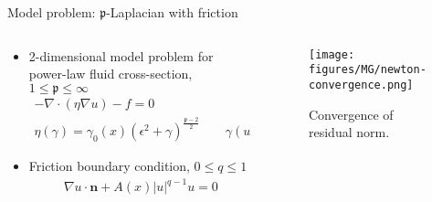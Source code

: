 \documentclass[final,t]{beamer}
\newcommand\pfrak{{\mathfrak p}}
\newcommand{\abs}[1]{\left\lvert #1 \right\rvert}
\begin{document}
\begin{frame}{}
\begin{columns}
\begin{column}{0.31\textwidth}
      \vspace{-2em}
      \begin{block}{Model problem: $\mathfrak p$-Laplacian with friction}        
        \begin{columns}
          \begin{column}{0.7\textwidth}
            \begin{itemize}
            \item 2-dimensional model problem for power-law fluid cross-section, $1 \le \pfrak \le \infty$
              \begin{gather*}
                -\nabla\cdot (\eta \nabla u) - f = 0 \\
                \eta(\gamma) = \gamma_0(x) (\epsilon^2 + \gamma)^{\frac{\pfrak-2}{2}} \qquad \gamma(u) = \frac 1 2 \abs{\nabla u}^2
              \end{gather*}
            \item Friction boundary condition, $0 \le q \le 1$
              \begin{gather*}
                \nabla u \cdot \bm n + A(x) \abs{u}^{q-1} u = 0
              \end{gather*}
            \end{itemize}
          \end{column}
          \begin{column}{0.3\textwidth}
            \begin{figure}
              \texttt{[image: figures/MG/newton-convergence.png]}
              \caption{Convergence of residual norm.}
            \end{figure}
          \end{column}
        \end{columns}


\end{block}
\end{column}
\end{columns}
\end{frame}
\end{document}
